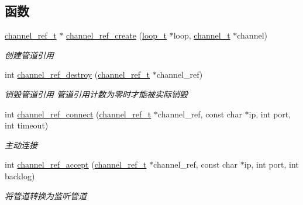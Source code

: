 \subsection*{函数}
\begin{DoxyCompactItemize}
\item 
\hyperlink{a00050_a151271c9d188ef28d4d24bb81dcc1263_a151271c9d188ef28d4d24bb81dcc1263}{channel\+\_\+ref\+\_\+t} $\ast$ \hyperlink{a00047_a82a1514a1b492ad693c7cb28606a5d01_a82a1514a1b492ad693c7cb28606a5d01}{channel\+\_\+ref\+\_\+create} (\hyperlink{a00050_a9c3ad1cd2de83e09f3a7b59fa82c94ee_a9c3ad1cd2de83e09f3a7b59fa82c94ee}{loop\+\_\+t} $\ast$loop, \hyperlink{a00050_a2effb3e20d0b7e5f6d5ac42118e0330b_a2effb3e20d0b7e5f6d5ac42118e0330b}{channel\+\_\+t} $\ast$channel)
\begin{DoxyCompactList}\small\item\em 创建管道引用 \end{DoxyCompactList}\item 
int \hyperlink{a00047_a8c61b880489dcb1a556e3458e748d9f7_a8c61b880489dcb1a556e3458e748d9f7}{channel\+\_\+ref\+\_\+destroy} (\hyperlink{a00050_a151271c9d188ef28d4d24bb81dcc1263_a151271c9d188ef28d4d24bb81dcc1263}{channel\+\_\+ref\+\_\+t} $\ast$channel\+\_\+ref)
\begin{DoxyCompactList}\small\item\em 销毁管道引用 管道引用计数为零时才能被实际销毁 \end{DoxyCompactList}\item 
int \hyperlink{a00101_ga1a8d1f5550cf26313cbb6575e8b2a32c_ga1a8d1f5550cf26313cbb6575e8b2a32c}{channel\+\_\+ref\+\_\+connect} (\hyperlink{a00050_a151271c9d188ef28d4d24bb81dcc1263_a151271c9d188ef28d4d24bb81dcc1263}{channel\+\_\+ref\+\_\+t} $\ast$channel\+\_\+ref, const char $\ast$ip, int port, int timeout)
\begin{DoxyCompactList}\small\item\em 主动连接 \end{DoxyCompactList}\item 
int \hyperlink{a00101_gae9ae0ae2a42eabf6a544ce4e0f001c9e_gae9ae0ae2a42eabf6a544ce4e0f001c9e}{channel\+\_\+ref\+\_\+accept} (\hyperlink{a00050_a151271c9d188ef28d4d24bb81dcc1263_a151271c9d188ef28d4d24bb81dcc1263}{channel\+\_\+ref\+\_\+t} $\ast$channel\+\_\+ref, const char $\ast$ip, int port, int backlog)
\begin{DoxyCompactList}\small\item\em 将管道转换为监听管道 \end{DoxyCompactList}\item 

\end{DoxyCompactItemize}
